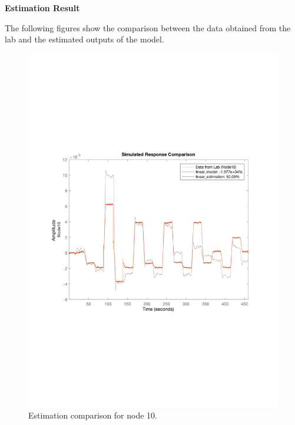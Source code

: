 \textbf{Estimation Result}

 

The following figures show the comparison between the data obtained from the lab and the estimated outputs of the model.  

\begin{figure}[H]
  \centering
  \begin{minipage}[b]{0.45\textwidth}
    \includegraphics[width=\textwidth]{report/pictures/Node10_estimation.pdf}
    \caption{Estimation comparison for node 10.}
  \end{minipage}
  \hfill
  \begin{minipage}[b]{0.45\textwidth}

\end{minipage}
\end{figure}
